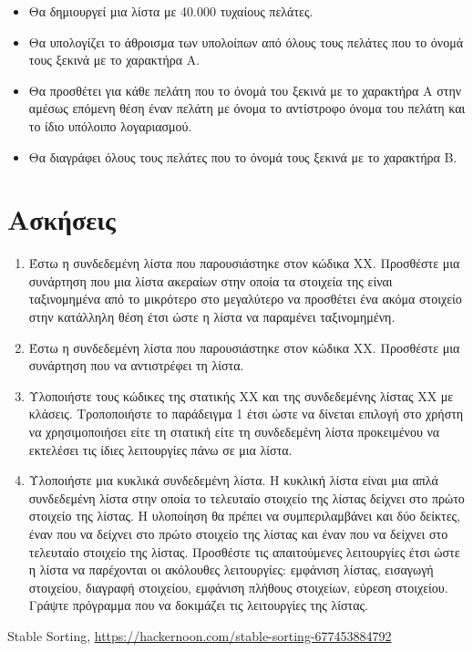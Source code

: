 \begin{itemize}[noitemsep]
\item Θα δημιουργεί μια λίστα με 40.000 τυχαίους πελάτες.
\item Θα υπολογίζει το άθροισμα των υπολοίπων από όλους τους πελάτες που το όνομά τους ξεκινά με το χαρακτήρα Α.
\item Θα προσθέτει για κάθε πελάτη που το όνομά του ξεκινά με το χαρακτήρα Α στην αμέσως επόμενη θέση έναν πελάτη με όνομα το αντίστροφο όνομα του πελάτη και το ίδιο υπόλοιπο λογαριασμού.
\item Θα διαγράφει όλους τους πελάτες που το όνομά τους ξεκινά με το χαρακτήρα Β.
\end{itemize}





\section{Ασκήσεις}
\begin{enumerate}
\item Έστω η συνδεδεμένη λίστα που παρουσιάστηκε στον κώδικα ΧΧ. Προσθέστε μια συνάρτηση που μια λίστα ακεραίων στην οποία τα στοιχεία της είναι ταξινομημένα από το μικρότερο στο μεγαλύτερο να προσθέτει ένα ακόμα στοιχείο στην κατάλληλη θέση έτσι ώστε η λίστα να παραμένει ταξινομημένη.
\item Έστω η συνδεδεμένη λίστα που παρουσιάστηκε στον κώδικα ΧΧ. Προσθέστε μια συνάρτηση που να αντιστρέφει τη λίστα.
\item Υλοποιήστε τους κώδικες της στατικής ΧΧ και της συνδεδεμένης λίστας ΧΧ με κλάσεις. Τροποποιήστε το παράδειγμα 1 έτσι ώστε να δίνεται επιλογή στο χρήστη να χρησιμοποιήσει είτε τη στατική είτε τη συνδεδεμένη λίστα προκειμένου να εκτελέσει τις ίδιες λειτουργίες πάνω σε μια λίστα. 
\item Υλοποιήστε μια κυκλικά συνδεδεμένη λίστα. Η κυκλική λίστα είναι μια απλά συνδεδεμένη λίστα στην οποία το τελευταίο στοιχείο της λίστας δείχνει στο πρώτο στοιχείο της λίστας. Η υλοποίηση θα πρέπει να συμπεριλαμβάνει και δύο δείκτες, έναν που να δείχνει στο πρώτο στοιχείο της λίστας και έναν που να δείχνει στο τελευταίο στοιχείο της λίστας. Προσθέστε τις απαιτούμενες λειτουργίες έτσι ώστε η λίστα να παρέχονται οι ακόλουθες λειτουργίες: εμφάνιση λίστας, εισαγωγή στοιχείου, διαγραφή στοιχείου, εμφάνιση πλήθους στοιχείων, εύρεση στοιχείου. Γράψτε πρόγραμμα που να δοκιμάζει τις λειτουργίες της λίστας.
\end{enumerate}


\begin{thebibliography}{9}

Stable Sorting, \href{https://hackernoon.com/stable-sorting-677453884792}{https://hackernoon.com/stable-sorting-677453884792}

\end{thebibliography}

